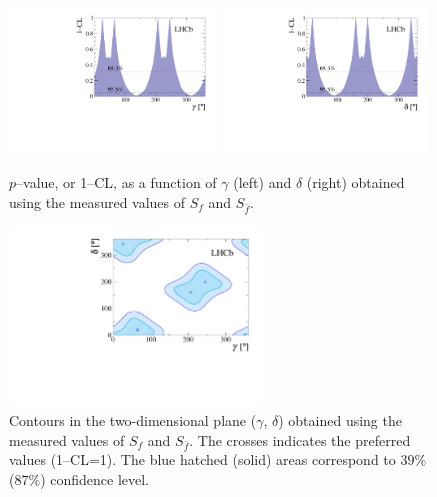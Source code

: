 \begin{figure}[t]
	\includegraphics[width=0.49\textwidth]{07Results/figs/gammacombo_bd2dmpip_g.pdf}
	\includegraphics[width=0.49\textwidth]{07Results/figs/gammacombo_bd2dmpip_d_dmpi.pdf}
	\vspace{-2mm}
        \caption{$p$--value, or 1--CL, as a function of $\gamma$ (left) and $\delta$ (right) obtained using the measured values of $S_{f}$
	and $S_{\bar f}$.}
	\label{fig:gammacombo}
\end{figure}

\begin{figure}[t]
\centering
	\includegraphics[width=0.6\textwidth]{07Results/figs/gamma_delta_lhcb.pdf}
	\vspace{-2mm}
        \caption{Contours in the two-dimensional plane ($\gamma$, $\delta$) obtained using the measured values of $S_{f}$
	and $S_{\bar f}$. The crosses indicates the preferred values (1--CL=1). The blue hatched (solid) areas correspond to $39\%$ ($87\%$) confidence level.}
	\label{fig:gammaCombo2D}
\end{figure}

